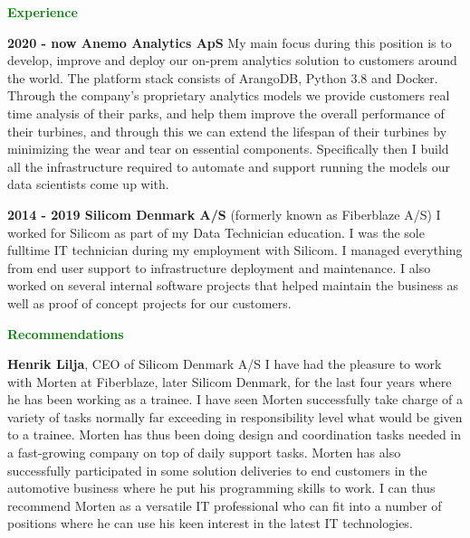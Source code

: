 \documentclass[11pt]{article}
\begin{document}
\textcolor{green}{{\fontsize{13}{16}\textbf{{Experience}}}}\newline

\textbf{2020 - now      Anemo Analytics ApS}\newline
My main focus during this position is to develop, improve and deploy our on-prem analytics solution to customers
around the world. The platform stack consists of ArangoDB, Python 3.8 and Docker. Through the company's
proprietary analytics models we provide customers real time analysis of their parks, and help them improve the
overall performance of their turbines, and through this we can extend the lifespan of their turbines by
minimizing the wear and tear on essential components. Specifically then I build all the infrastructure required
to automate and support running the models our data scientists come up with.\newline

\textbf{2014 - 2019     Silicom Denmark A/S} (formerly known as Fiberblaze A/S)\newline
I worked for Silicom as part of my Data Technician education. I was the sole fulltime IT technician during my
employment with Silicom. I managed everything from end user support to infrastructure deployment and
maintenance. I also worked on several internal software projects that helped maintain the business as well as
proof of concept projects for our customers.\newline

\textcolor{green}{{\fontsize{13}{16}\textbf{{Recommendations}}}}\newline

\textbf{Henrik Lilja}, CEO of Silicom Denmark A/S\newline
I have had the pleasure to work with Morten at Fiberblaze, later Silicom Denmark, for the last four years where
he has been working as a trainee. I have seen Morten successfully take charge of a variety of tasks normally far
exceeding in responsibility level what would be given to a trainee.  Morten has thus been doing design and
coordination tasks needed in a fast-growing company on top of daily support tasks. Morten has also successfully
participated in some solution deliveries to end customers in the automotive business where he put his
programming skills to work. I can thus recommend Morten as a versatile IT professional who can fit into a number
of positions where he can use his keen interest in the latest IT technologies.\newline
\end{document}
